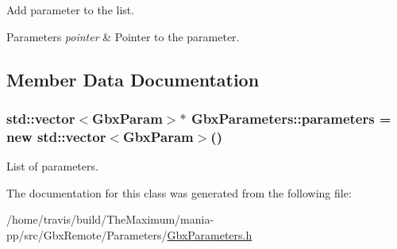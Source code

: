 Add parameter to the list. 


\begin{DoxyParams}{Parameters}
{\em pointer} & Pointer to the parameter. \\
\hline
\end{DoxyParams}


\subsection{Member Data Documentation}
\hypertarget{classGbxParameters_af2c27b8d1e5c3884d0e5cc9ba04953cf}{
\subsubsection[{parameters}]{\setlength{\rightskip}{0pt plus 5cm}std\-::vector$<${\bf Gbx\-Param}$>$$\ast$ Gbx\-Parameters\-::parameters = new std\-::vector$<${\bf Gbx\-Param}$>$()\hspace{0.3cm}{\ttfamily [private]}}}\label{classGbxParameters_af2c27b8d1e5c3884d0e5cc9ba04953cf}


List of parameters. 



The documentation for this class was generated from the following file\-:\begin{DoxyCompactItemize}
\item 
/home/travis/build/\-The\-Maximum/mania-\/pp/src/\-Gbx\-Remote/\-Parameters/\hyperlink{GbxParameters_8h}{Gbx\-Parameters.\-h}\end{DoxyCompactItemize}

